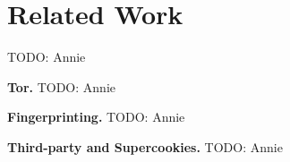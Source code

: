 \section{Related Work}
\label{sec:related}
TODO: Annie

{\bf Tor.}
TODO: Annie

{\bf Fingerprinting.}
TODO: Annie

{\bf Third-party and Supercookies.}
TODO: Annie
